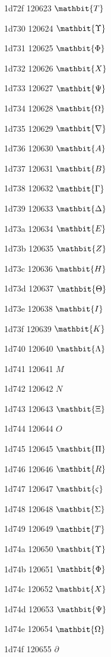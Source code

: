 \documentclass[11pt]{article}
\begin{document}
1d72f 120623 \ensuremath{\mathbit{T}}

1d730 120624 \ensuremath{\mathbit{\Upsilon}}

1d731 120625 \ensuremath{\mathbit{\Phi}}

1d732 120626 \ensuremath{\mathbit{X}}

1d733 120627 \ensuremath{\mathbit{\Psi}}

1d734 120628 \ensuremath{\mathbit{\Omega}}

1d735 120629 \ensuremath{\mathbit{\nabla}}

1d736 120630 \ensuremath{\mathbit{A}}

1d737 120631 \ensuremath{\mathbit{B}}

1d738 120632 \ensuremath{\mathbit{\Gamma}}

1d739 120633 \ensuremath{\mathbit{\Delta}}

1d73a 120634 \ensuremath{\mathbit{E}}

1d73b 120635 \ensuremath{\mathbit{Z}}

1d73c 120636 \ensuremath{\mathbit{H}}

1d73d 120637 \ensuremath{\mathbit{\Theta}}

1d73e 120638 \ensuremath{\mathbit{I}}

1d73f 120639 \ensuremath{\mathbit{K}}

1d740 120640 \ensuremath{\mathbit{\Lambda}}

1d741 120641 \ensuremath{M}

1d742 120642 \ensuremath{N}

1d743 120643 \ensuremath{\mathbit{\Xi}}

1d744 120644 \ensuremath{O}

1d745 120645 \ensuremath{\mathbit{\Pi}}

1d746 120646 \ensuremath{\mathbit{R}}

1d747 120647 \ensuremath{\mathbit{\varsigma}}

1d748 120648 \ensuremath{\mathbit{\Sigma}}

1d749 120649 \ensuremath{\mathbit{T}}

1d74a 120650 \ensuremath{\mathbit{\Upsilon}}

1d74b 120651 \ensuremath{\mathbit{\Phi}}

1d74c 120652 \ensuremath{\mathbit{X}}

1d74d 120653 \ensuremath{\mathbit{\Psi}}

1d74e 120654 \ensuremath{\mathbit{\Omega}}

1d74f 120655 \ensuremath{\partial}
\end{document}
